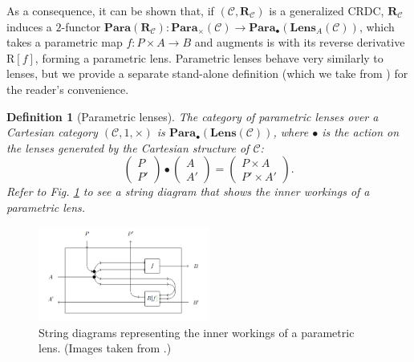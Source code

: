 \documentclass[11pt,a4paper,openright,twoside]{report}
\newcounter{mycounter}
\theoremstyle{plain}
\newtheorem{definition}[mycounter]{Definition}
\theoremstyle{definition}
\begin{document}
As a consequence, it can be shown that, if  $(\mathcal{C}, \mathbf{R}_{\mathcal{C}})$ is a generalized CRDC,  $\mathbf{R}_{\mathcal{C}}$ induces a $2$-functor $\mathbf{Para}(\mathbf{R}_{\mathcal{C}}): \mathbf{Para}_{\times}(\mathcal{C}) \to \mathbf{Para}_{\bullet}(\mathbf{Lens}_A(\mathcal{C}))$, which takes a parametric map $f: P \times A \to B$ and augments is with its reverse derivative $\mathrm{R}[f]$, forming a parametric lens. Parametric lenses behave very similarly to lenses, but we provide a separate stand-alone definition (which we take from \cite{cruttwell2022categorical}) for the reader's convenience.

\begin{definition}[Parametric lenses]
  The category of parametric lenses over a Cartesian category $(\mathcal{C},1,\times)$ is $\mathbf{Para}_{\bullet}(\mathbf{Lens}(\mathcal{C}))$, where $\bullet$ is the action on the lenses generated by the Cartesian structure of $\mathcal{C}$:
  \[\begin{pmatrix}
    P \\ P'
  \end{pmatrix} \bullet \begin{pmatrix}
    A \\ A'
  \end{pmatrix} = \begin{pmatrix}
    P \times A \\ P' \times A'
  \end{pmatrix}.\]
  Refer to \textit{Fig. \ref{fig: paralenses}} to see a string diagram that shows the inner workings of a parametric lens.
\end{definition}

\begin{figure}[h]
  \begin{center}
    \includegraphics[width=0.5\textwidth]{figures/parametric_lens.png}             
    \caption[Parametric lens]{String diagrams representing the inner workings of a parametric lens. (Images taken from \cite{cruttwell2022categorical}.)}
    \label{fig: paralenses}
  \end{center}
\end{figure}
\end{document}
